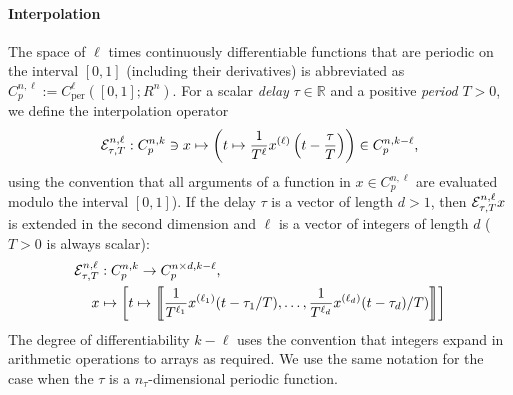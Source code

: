 \documentclass[11pt]{scrartcl}
\newcommand{\R}{\mathbb{R}}
\newcommand{\llb}{\left\llbracket}
\newcommand{\rrb}{\right\rrbracket}
\begin{document}
\paragraph{Interpolation}
The space of $\ell$ times continuously differentiable functions that
are periodic on the interval $[0,1]$ (including their derivatives) is
abbreviated as $C_p^{n,\ell}:=C_\mathrm{per}^\ell([0,1];R^n)$. For a
scalar \emph{delay} $\tau\in\R$ and a positive \emph{period} $T>0$, we define the
interpolation operator
\begin{align*}
  {\cal E}^{n,\ell}_{\tau,T}:C^{n,k}_p\ni x\mapsto \left(t\mapsto \frac{1}{T^\ell}x^{(\ell)}\left(t-\frac{\tau}{T}\right)\right)\in C^{n,k-\ell}_p\mbox{,}
\end{align*}
using the convention that all arguments of a function in
$x\in C^{n,\ell}_p$ are evaluated modulo the interval $[0,1]$). If the
delay $\tau$ is a vector of length $d>1$, then
${\cal E}^{n,\ell}_{\tau,T}x$ is extended in the second dimension and
$\ell$ is a vector of integers of length $d$ ($T>0$ is always scalar):
\begin{align*}
  {\cal E}^{n,\ell}_{\tau,T}&:C^{n,k}_p\to  C^{n\times d,k-\ell}_p\mbox{,}\\
  x&\mapsto \left[t\mapsto
    \llb \frac{1}{T^{\ell_1}}x^{(\ell_1)}(t-\tau_1/T),\ldots,
    \frac{1}{T^{\ell_d}}x^{(\ell_d)}(t-\tau_d)/T)\rrb\right]
\end{align*}
The degree of differentiability $k-\ell$ uses the convention that
integers expand in arithmetic operations to arrays as required.  We
use the same notation for the case when the  $\tau$ is a
$n_\tau$-dimensional periodic function.
\end{document}
